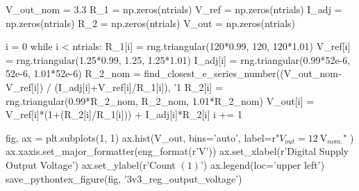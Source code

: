 \documentclass[12pt, titlepage]{tex-template}
\begin{document}
\begin{pycode}
V_out_nom = 3.3
R_1 = np.zeros(ntrials)
V_ref = np.zeros(ntrials)
I_adj = np.zeros(ntrials)
R_2 = np.zeros(ntrials)
V_out = np.zeros(ntrials)

i = 0
while i < ntrials: 
    R_1[i] = rng.triangular(120*0.99, 120, 120*1.01)
    V_ref[i] = rng.triangular(1.25*0.99, 1.25, 1.25*1.01)
    I_adj[i] = rng.triangular(0.99*52e-6, 52e-6, 1.01*52e-6)
    R_2_nom = find_closest_e_series_number((V_out_nom-V_ref[i]) / (I_adj[i]+V_ref[i]/R_1[i]), '1%
    R_2[i] = rng.triangular(0.99*R_2_nom, R_2_nom, 1.01*R_2_nom)
    V_out[i] = V_ref[i]*(1+(R_2[i]/R_1[i])) + I_adj[i]*R_2[i]
    i += 1

fig, ax = plt.subplots(1, 1)
ax.hist(V_out, bins='auto', label=r"$V_{out}=\SI{12}{\volt}_{nom.}$" )
ax.xaxis.set_major_formatter(eng_format(r'\unit{\volt}'))
ax.set_xlabel(r'Digital Supply Output Voltage')
ax.set_ylabel(r'Count $\left(1\right)$')
ax.legend(loc='upper left')
save_pythontex_figure(fig, '3v3_reg_output_voltage')
\end{pycode}
\end{document}
